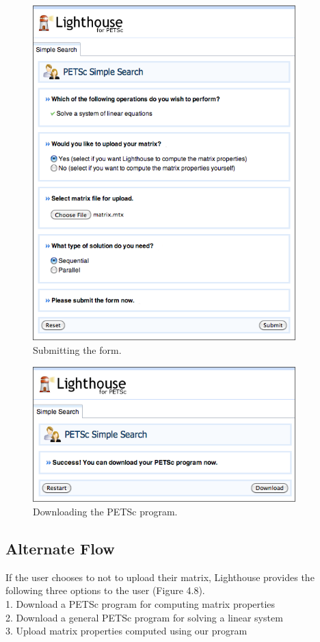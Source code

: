 \begin{figure}[H]\label{petscui5}
  \centering
  \includegraphics[width=4in]{figs/petsc_5}
  \caption[Submitting the form.]
   {Submitting the form.}
\end{figure}

\begin{figure}[H]\label{petscui7}
  \centering
  \includegraphics[width=4in]{figs/petsc_7}
  \caption[Downloading the PETSc program.]
   {Downloading the PETSc program.}
\end{figure}

\subsection{Alternate Flow}
If the user chooses to not to upload their matrix, Lighthouse provides the following three options to the user (Figure 4.8).\\
\hspace*{1em} 1. Download a PETSc program for computing matrix properties\\
\hspace*{1em} 2. Download a general PETSc program for solving a linear system\\
\hspace*{1em} 3. Upload matrix properties computed using our program

